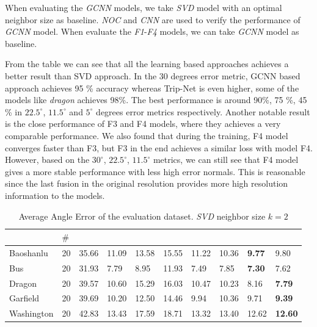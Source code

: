 When evaluating the \textit{GCNN} models, we take \textit{SVD} model with an optimal neighbor size as baseline. \textit{NOC} and \textit{CNN} are used to verify the performance of \textit{GCNN} model. When evaluate the \textit{F1}-\textit{F4} models, we can take \textit{GCNN} model as baseline. 

From the table we can see that all the learning based approaches achieves a better result than SVD approach. In the 30 degrees error metric, GCNN based approach achieves 95 \% accuracy whereas Trip-Net is even higher, some of the models like \textit{dragon} achieves 98\%. The best performance is around 90\%, 75 \%, 45 \% in $ 22.5^\circ $, $ 11.5^\circ $ and $ 5^\circ $ degrees error metrics respectively. Another notable result is the close performance of F3 and F4 models, where they achieves a very comparable performance. We also found that during the training, F4 model converges faster than F3, but F3 in the end achieves a similar loss with model F4. However, based on the $ 30^\circ $, $ 22.5^\circ $, $ 11.5^\circ $ metrics, we can still see that F4 model gives a more stable performance with less high error normals. This is reasonable since the last fusion in the original resolution provides more high resolution information to the models.


\begin{table}[H]
	\centering
	\begin{tabular}{l l | l | l l l | l l l l }
		\toprule
		\tabhead{Object} & $ \# $ & \tabhead{SVD} & \tabhead{GCNN} & \tabhead{NOC} & \tabhead{CNN} & \tabhead{F1}& \tabhead{F2}& \tabhead{F3}& \tabhead{F4}\\
		\midrule
		Baoshanlu  		& 20 & 35.66 & 11.09 & 13.58 & 15.55 & 11.22 & 10.36 &\textbf{ 9.77 }& 9.80 \\ 
		\hline
		Bus 			& 20 & 31.93 & 7.79 & 8.95 & 11.93 & 7.49 & 7.85 & \textbf{7.30} & 7.62\\ 
		\hline
		Dragon 			& 20 & 39.57 & 10.60 & 15.29 & 16.03 & 10.47 & 10.23 & 8.16 &\textbf{ 7.79} \\
		\hline
		Garfield 		& 20 & 39.69 & 10.20 & 12.50 & 14.46 & 9.94 & 10.36 & 9.71 &\textbf{ 9.39} \\
		\hline
		Washington 		& 20 & 42.83 & 13.43 & 17.59 & 18.71 & 13.32 & 13.40 & 12.62 &\textbf{ 12.60}\\
		\bottomrule
	\end{tabular}
	\caption{Average Angle Error of the evaluation dataset. \textit{SVD} neighbor size $ k=2 $}	
	\label{tab:eval-mean}
\end{table}

